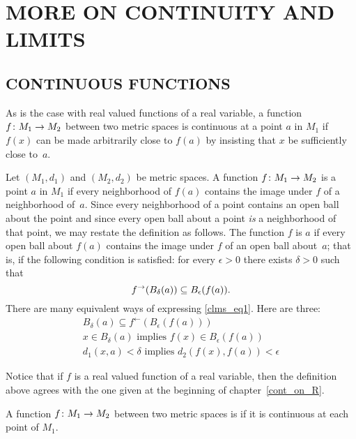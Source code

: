 \chapter{MORE ON CONTINUITY AND LIMITS}

\section{CONTINUOUS FUNCTIONS}
As is the case with real valued functions of a real variable, a function $f\colon M_1 \rightarrow
M_2$ between two metric spaces is continuous at a point $a$ in $M_1$ if $f(x)$ can be made
arbitrarily close to $f(a)$ by insisting that $x$ be sufficiently close to~$a$.

\begin{defn} Let $(M_1,d_1)$ and $(M_2,d_2)$ be metric spaces.  A function $f\colon M_1 \rightarrow M_2$ is
 a point $a$ in $M_1$ if every neighborhood of $f(a)$ contains the image under
$f$ of a neighborhood of~$a$. Since every neighborhood of a point contains an open ball about the
point and since every open ball about a point \emph{is} a neighborhood of that point, we may
restate the definition as follows. The function $f$ is  $a$ if every open ball
about $f(a)$ contains the image under $f$ of an open ball about~$a$; that is, if the following
condition is satisfied: for every $\epsilon > 0$ there exists $\delta > 0$ such that
  \begin{equation}\label{clms_eq1} f^{\rightarrow} (B_\delta(a))
                      \subseteq B_\epsilon(f(a)).
  \end{equation}
There are many equivalent ways of expressing \eqref{clms_eq1}.
Here are three:
 \begin{gather*}
    B_\delta(a) \subseteq f^\gets(B_\epsilon(f(a))) \\
    x \in B_\delta(a) \text{ implies } f(x) \in B_\epsilon(f(a)) \\
    d_1(x,a) < \delta \text{ implies } d_2(f(x),f(a)) < \epsilon
 \end{gather*}
\end{defn}

Notice that if $f$ is a real valued function of a real variable, then the definition above agrees
with the one given at the beginning of chapter~\ref{cont_on_R}.

\begin{defn} A function $f\colon M_1 \rightarrow M_2$ between two metric spaces is
 if it is continuous at each point of $M_1$.
\end{defn}

